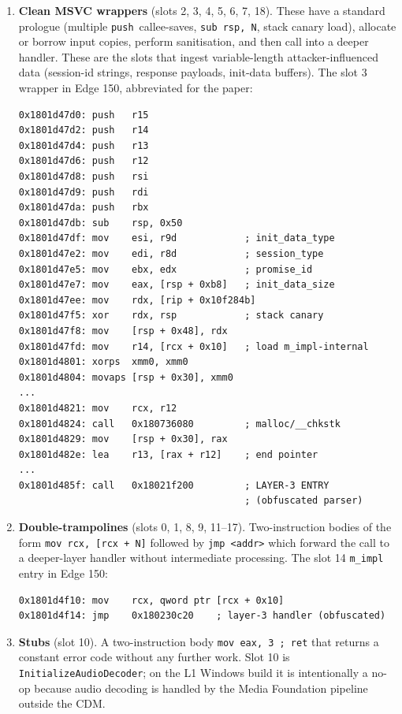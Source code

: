 \documentclass[11pt,letterpaper]{article}
\begin{document}
\begin{enumerate}[itemsep=2pt,topsep=2pt]
  \item \textbf{Clean MSVC wrappers} (slots 2, 3, 4, 5, 6, 7, 18).
        These have a standard prologue (multiple
        \texttt{push}~callee-saves, \texttt{sub rsp, N}, stack
        canary load), allocate or borrow input copies, perform
        sanitisation, and then call into a deeper handler. These
        are the slots that ingest variable-length
        attacker-influenced data (session-id strings, response
        payloads, init-data buffers). The slot 3 wrapper in Edge
        150, abbreviated for the paper:

\begin{lstlisting}[basicstyle=\ttfamily\scriptsize]
0x1801d47d0: push   r15
0x1801d47d2: push   r14
0x1801d47d4: push   r13
0x1801d47d6: push   r12
0x1801d47d8: push   rsi
0x1801d47d9: push   rdi
0x1801d47da: push   rbx
0x1801d47db: sub    rsp, 0x50
0x1801d47df: mov    esi, r9d            ; init_data_type
0x1801d47e2: mov    edi, r8d            ; session_type
0x1801d47e5: mov    ebx, edx            ; promise_id
0x1801d47e7: mov    eax, [rsp + 0xb8]   ; init_data_size
0x1801d47ee: mov    rdx, [rip + 0x10f284b]
0x1801d47f5: xor    rdx, rsp            ; stack canary
0x1801d47f8: mov    [rsp + 0x48], rdx
0x1801d47fd: mov    r14, [rcx + 0x10]   ; load m_impl-internal
0x1801d4801: xorps  xmm0, xmm0
0x1801d4804: movaps [rsp + 0x30], xmm0
...
0x1801d4821: mov    rcx, r12
0x1801d4824: call   0x180736080         ; malloc/__chkstk
0x1801d4829: mov    [rsp + 0x30], rax
0x1801d482e: lea    r13, [rax + r12]    ; end pointer
...
0x1801d485f: call   0x18021f200         ; LAYER-3 ENTRY
                                        ; (obfuscated parser)
\end{lstlisting}

  \item \textbf{Double-trampolines} (slots 0, 1, 8, 9, 11--17).
        Two-instruction bodies of the form
        \texttt{mov rcx, [rcx + N]} followed by \texttt{jmp <addr>}
        which forward the call to a deeper-layer handler without
        intermediate processing. The slot 14 \texttt{m\_impl}
        entry in Edge 150:

\begin{lstlisting}[basicstyle=\ttfamily\scriptsize]
0x1801d4f10: mov    rcx, qword ptr [rcx + 0x10]
0x1801d4f14: jmp    0x180230c20    ; layer-3 handler (obfuscated)
\end{lstlisting}

  \item \textbf{Stubs} (slot 10). A two-instruction body
        \texttt{mov eax, 3 ; ret} that returns a constant error
        code without any further work. Slot 10 is
        \texttt{InitializeAudioDecoder}; on the L1 Windows build it
        is intentionally a no-op because audio decoding is handled
        by the Media Foundation pipeline outside the CDM.
\end{enumerate}
\end{document}
